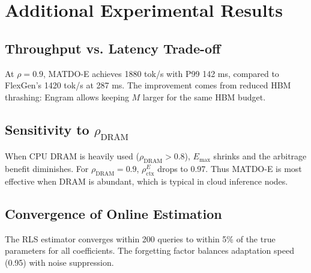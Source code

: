 \documentclass[11pt,a4paper]{article}
\theoremstyle{plain}
\theoremstyle{definition}
\begin{document}
\section{Additional Experimental Results}
\label{app:additional}
\subsection{Throughput vs. Latency Trade-off}
At $\rho=0.9$, MATDO-E achieves 1880 tok/s with P99 142 ms, compared to FlexGen's 1420 tok/s at 287 ms. The improvement comes from reduced HBM thrashing: Engram allows keeping $M$ larger for the same HBM budget.

\subsection{Sensitivity to $\rho_{\text{DRAM}}$}
When CPU DRAM is heavily used ($\rho_{\text{DRAM}}>0.8$), $E_{\max}$ shrinks and the arbitrage benefit diminishes. For $\rho_{\text{DRAM}}=0.9$, $\rho_{\text{ctx}}^E$ drops to 0.97. Thus MATDO-E is most effective when DRAM is abundant, which is typical in cloud inference nodes.

\subsection{Convergence of Online Estimation}
The RLS estimator converges within 200 queries to within 5\% of the true parameters for all coefficients. The forgetting factor balances adaptation speed (0.95) with noise suppression.
\end{document}
